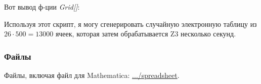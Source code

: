 

Вот вывод ф-ции \textit{Grid[]}:



Используя этот скрипт, я могу сгенерировать случайную электронную таблицу из $26 \cdot 500=13000$ ячеек,
которая затем обрабатывается Z3 несколько секунд.

\subsubsection{Файлы}

Файлы, включая файл для Mathematica: \url{.../spreadsheet}.


